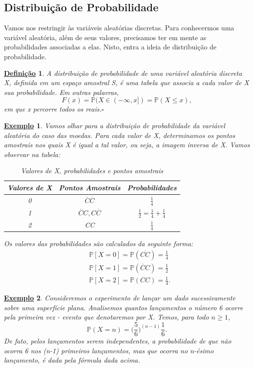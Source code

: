 \documentclass{article}
\newtheorem*{def*}{\underline{Defini\c c\~ao}}
\newtheorem{example}{\underline{Exemplo}}
\begin{document}
\subsection{Distribuição de Probabilidade}
Vamos nos restringir às variáveis aleatórias discretas. Para conhecermos uma variável aleatória,
além de seus valores, precisamos ter em mente as probabilidades associadas a elas. Nisto, entra a ideia
de distribuição de probabilidade.
\begin{def*}
  A distribuição de probabilidade de uma variável aleatória discreta X, definida em um espaço amostral S,
  é uma tabela que associa a cada valor de X sua probabilidade. Em outras palavras, 
  \[
    F(x) = \mathbb{P}(X\in (-\infty, x]) = \mathbb{P}(X\leq x),
  \]
  em que x percorre todos os reais.\(\square\)
\end{def*}
\begin{example}
  Vamos olhar para a distribuição de probabilidade da variável aleatória do caso das moedas.
  Para cada valor de X, determinamos os pontos amostrais nos quais X é igual a tal valor, ou seja,
  a imagem inversa de X. Vamos observar na tabela:
  \begin{center}
    \begin{table}[h]
      \caption{Valores de X, probabilidades e pontos amostrais}

      \centering
      \begin{tabular}{| c | c | c |}
        \hline
        Valores de X & Pontos Amostrais & Probabilidades\\
        \hline
        0 & \(\overline{C}\overline{C}\) & \(\frac{1}{4}\)\\
        1 & \(\overline{C}C, C\overline{C}\) & \(\frac{1}{2} = \frac{1}{4} + \frac{1}{4}\)\\
        2 & CC & \(\frac{1}{4}\)\\
        \hline
      \end{tabular}
    \end{table}
  \end{center}
  Os valores das probabilidades são calculados da seguinte forma:
  \begin{align*}
   &\mathbb{P}[X = 0] = \mathbb{P}(\overline{CC}) = \frac{1}{4}\\
   &\mathbb{P}[X = 1] = \mathbb{P}(\overline{C}C) = \frac{1}{2}\\
   &\mathbb{P}[X = 2] = \mathbb{P}(CC) = \frac{1}{4}.
  \end{align*}
\end{example}
\begin{example}
  Consideremos o experimento de lançar um dado sucessivamente sobre uma superfície plana. 
  Analisemos quantos lançamentos o número 6 ocorre pela primeira vez - evento que denotaremos por X.
  Temos, para todo \(n\geq 1\), 
  \[
    \mathbb{P}(X = n) = \biggl(\frac{5}{6}\biggr)^{(n-1)}\frac{1}{6}.
  \]
  De fato, pelos lançamentos serem independentes, a probabilidade de que não ocorra 6 nos
  (n-1) primeiros lançamentos, mas que ocorra no n-ésimo lançamento, é dada pela fórmula dada acima.
\end{example}
\end{document}
